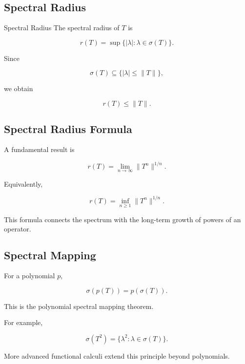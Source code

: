 \subsection{Spectral Radius}
\label{subsec:spectral-radius}

\begin{definitionbox}{Spectral Radius}
The spectral radius of \(T\) is

\[
\boxed{
r(T)
=
\sup\{
|\lambda|:\lambda\in\sigma(T)
\}.
}
\]
\end{definitionbox}

Since

\[
\sigma(T)
\subseteq
\{
|\lambda|\leq\|T\|
\},
\]

we obtain

\[
\boxed{
r(T)\leq\|T\|.
}
\]

\subsection{Spectral Radius Formula}
\label{subsec:spectral-radius-formula}

A fundamental result is

\[
\boxed{
r(T)
=
\lim_{n\to\infty}
\|T^n\|^{1/n}.
}
\]

Equivalently,

\[
\boxed{
r(T)
=
\inf_{n\geq1}
\|T^n\|^{1/n}.
}
\]

This formula connects the spectrum with the long-term growth of powers
of an operator.

\subsection{Spectral Mapping}
\label{subsec:spectral-mapping}

For a polynomial \(p\),

\[
\boxed{
\sigma(p(T))
=
p(\sigma(T)).
}
\]

This is the polynomial spectral mapping theorem.

For example,

\[
\boxed{
\sigma(T^2)
=
\{
\lambda^2:
\lambda\in\sigma(T)
\}.
}
\]

More advanced functional calculi extend this principle beyond
polynomials.

